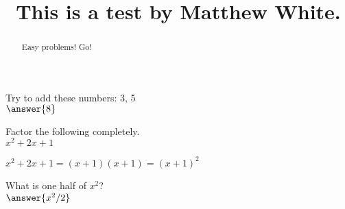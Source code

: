 \documentclass{ximera}
\title{This is a test by Matthew White.}
\begin{document}
	\begin{abstract}
		Easy problems! Go!
	\end{abstract}
	\maketitle
	
	
\begin{question}
	Try to add these numbers: 3, 5\\
	$\answer{8}$
\end{question}

	
  \begin{question}
  		Factor the following completely.\\
  		$ x^2 + 2x + 1 $ 
  		\begin{hint}
  			$ x^2 + 2x + 1 = (x + 1)(x + 1) = (x + 1)^2 $
  		\end{hint}
  		\begin{prompt}
  			\begin{multipleChoice}
  			\end{multipleChoice}
  		\end{prompt}
  \end{question}

	\begin{question}
		What is one half of $x^2$?\\
		$	\answer{x^2/2}$
	\end{question}

	
\end{document}
